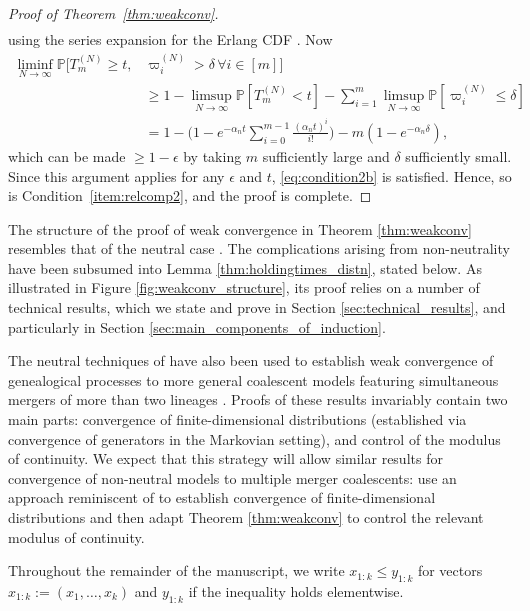 \documentclass[12pt,authoryear]{article}
\theoremstyle{definition}
\newcommand{\Prob}{\mathbb{P}}
\newcommand{\1}[1]{\mathbbm{1}_{#1}}
\begin{document}
\begin{proof}[Proof of Theorem~\ref{thm:weakconv}]
\begin{align*}
\end{align*}
using the series expansion for the Erlang CDF \citep[see for example][Chapter 15]{forbes2011}.
Now
\begin{align*}
\liminf_{N\to\infty} 
        \Prob[ T_m^{(N)} \geq t, &\varpi_i^{(N)} > \delta 
        \,\forall i\in [m] ] \\
&\geq 1 - \limsup_{N\to\infty} \Prob\left[ T_m^{(N)} < t \right] 
        - \sum_{i=1}^m \limsup_{N\to\infty} \Prob\left[ \varpi_i^{(N)} \leq \delta\right]\\
&= 1- \Bigg( 1- e^{-\alpha_n t} \sum_{i=0}^{m-1} 
        \frac{(\alpha_n t)^i}{i!} \Bigg) - m( 1- e^{-\alpha_n \delta} ) ,
\end{align*}
which can be made $\geq 1-\epsilon$ by taking $m$ sufficiently large and $\delta$ sufficiently small.
Since this argument applies for any $\epsilon$ and $t$, \eqref{eq:condition2b} is satisfied.
Hence, so is Condition~\ref{item:relcomp2}, and the proof is complete.
\end{proof}

The structure of the proof of weak convergence in Theorem \ref{thm:weakconv} resembles that of the neutral case \citep[Theorem 3.1]{mohle1999}.
The complications arising from non-neutrality have been subsumed into Lemma \ref{thm:holdingtimes_distn}, stated below.
As illustrated in Figure \ref{fig:weakconv_structure}, its proof relies on a number of technical results, which we state and prove in Section \ref{sec:technical_results}, and particularly in Section \ref{sec:main_components_of_induction}.

The neutral techniques of \cite{mohle1999} have also been used to establish weak convergence of genealogical processes to more general coalescent models featuring simultaneous mergers of more than two lineages \citep{mohle2001, mohle2003, sagitov2003}.
Proofs of these results invariably contain two main parts: convergence of finite-dimensional distributions (established via convergence of generators in the Markovian setting), and control of the modulus of continuity.
We expect that this strategy will allow similar results for convergence of non-neutral models to multiple merger coalescents: use an approach reminiscent of \citet[Theorem 1]{koskela2020annals} to establish convergence of finite-dimensional distributions and then adapt Theorem \ref{thm:weakconv} to control the relevant modulus of continuity.

Throughout the remainder of the manuscript, we write $x_{ 1 : k } \leq y_{ 1 : k }$ for vectors $x_{ 1 : k } := ( x_1, \ldots, x_k )$ and $y_{ 1 : k }$ if the inequality holds elementwise.
\end{document}
